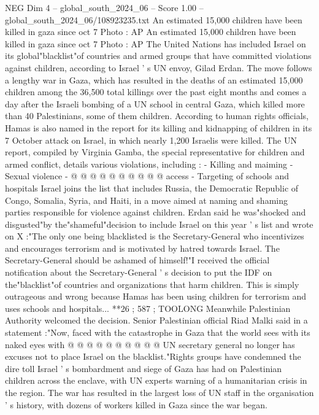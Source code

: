 \begin{textsample}{NEG Dim 4 – global\_south\_2024\_06 – Score 1.00 – global\_south\_2024\_06/108923235.txt}  \label{ex:f4_neg_378}
An estimated 15,000 children have been killed in gaza since oct 7 Photo : AP An estimated 15,000 children have been killed in gaza since oct 7 Photo : AP The United Nations has included Israel on its global"blacklist"of countries and armed groups that have committed violations against children, according to Israel ' s UN envoy, Gilad Erdan.
The move follows a lengthy war in Gaza, which has resulted in the deaths of an estimated 15,000 children among the 36,500 total killings over the past eight months and comes a day after the Israeli bombing of a UN school in central Gaza, which killed more than 40 Palestinians, some of them children.
According to human rights officials, Hamas is also named in the report for its killing and kidnapping of children in its 7 October attack on Israel, in which nearly 1,200 Israelis were killed.
The UN report, compiled by Virginia Gamba, the special representative for children and armed conflict, details various violations, including : - Killing and maiming - Sexual violence - @ @ @ @ @ @ @ @ @ @ access - Targeting of schools and hospitals Israel joins the list that includes Russia, the Democratic Republic of Congo, Somalia, Syria, and Haiti, in a move aimed at naming and shaming parties responsible for violence against children.
Erdan said he was"shocked and disgusted"by the"shameful"decision to include Israel on this year ' s list and wrote on X :"The only one being blacklisted is the Secretary-General who incentivizes and encourages terrorism and is motivated by hatred towards Israel.
The Secretary-General should be ashamed of himself!"I received the official notification about the Secretary-General ' s decision to put the IDF on the"blacklist"of countries and organizations that harm children.
This is simply outrageous and wrong because Hamas has been using children for terrorism and uses schools and hospitals... **26 ; 587 ; TOOLONG Meanwhile Palestinian Authority welcomed the decision.
Senior Palestinian official Riad Malki said in a statement :"Now, faced with the catastrophe in Gaza that the world sees with its naked eyes with @ @ @ @ @ @ @ @ @ @ UN secretary general no longer has excuses not to place Israel on the blacklist."Rights groups have condemned the dire toll Israel ' s bombardment and siege of Gaza has had on Palestinian children across the enclave, with UN experts warning of a humanitarian crisis in the region.
The war has resulted in the largest loss of UN staff in the organisation ' s history, with dozens of workers killed in Gaza since the war began.

\end{textsample}
